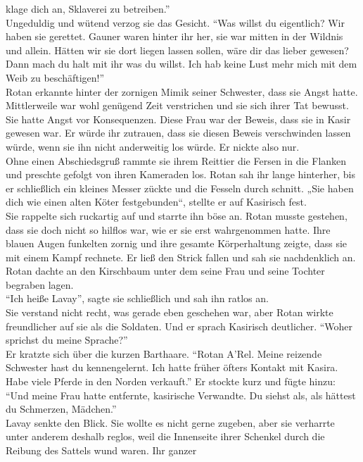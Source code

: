 klage dich an, Sklaverei zu betreiben.''\\
Ungeduldig und wütend verzog sie das Gesicht. ``Was willst du eigentlich? Wir haben sie gerettet. 
Gauner waren hinter ihr her, sie war mitten in der Wildnis und allein. Hätten wir sie dort liegen 
lassen sollen, wäre dir das lieber gewesen? Dann mach du halt mit ihr was du willst. Ich hab keine 
Lust mehr mich mit dem Weib zu beschäftigen!''\\
Rotan erkannte hinter der zornigen Mimik seiner Schwester, dass sie Angst hatte. Mittlerweile war 
wohl genügend Zeit verstrichen und sie sich ihrer Tat bewusst. Sie hatte Angst vor Konsequenzen. 
Diese Frau war der Beweis, dass sie in Kasir gewesen war. Er würde ihr zutrauen, dass sie diesen 
Beweis verschwinden lassen würde, wenn sie ihn nicht anderweitig los würde. Er nickte also nur.\\
Ohne einen Abschiedsgruß rammte sie ihrem Reittier die Fersen in die Flanken und preschte gefolgt 
von ihren Kameraden los. Rotan sah ihr lange hinterher, bis er schließlich ein kleines Messer 
zückte und die Fesseln durch schnitt. „Sie haben dich wie einen alten Köter festgebunden“, stellte 
er auf Kasirisch fest.\\
Sie rappelte sich ruckartig auf und starrte ihn böse an. Rotan musste gestehen, dass sie doch nicht 
so hilflos war, wie er sie erst wahrgenommen hatte. Ihre blauen Augen funkelten zornig und ihre 
gesamte Körperhaltung zeigte, dass sie mit einem Kampf rechnete. Er ließ den Strick fallen und sah 
sie nachdenklich an. Rotan dachte an den Kirschbaum unter dem seine Frau und seine Tochter begraben 
lagen.\\
``Ich heiße Lavay'', sagte sie schließlich und sah ihn ratlos an. \\
Sie verstand nicht recht, was gerade eben geschehen war, aber Rotan wirkte freundlicher auf sie als 
die Soldaten. Und er sprach Kasirisch deutlicher. ``Woher sprichst du meine Sprache?''\\
Er kratzte sich über die kurzen Barthaare. ``Rotan A'Rel. Meine reizende Schwester hast du 
kennengelernt. Ich hatte früher öfters Kontakt mit Kasira. Habe viele Pferde in den Norden 
verkauft.'' Er stockte kurz und fügte hinzu: ``Und meine Frau hatte entfernte, kasirische 
Verwandte. Du siehst als, als hättest du Schmerzen, Mädchen.''\\
Lavay senkte den Blick. Sie wollte es nicht gerne zugeben, aber sie verharrte unter anderem deshalb 
reglos, weil die Innenseite ihrer Schenkel durch die Reibung des Sattels wund waren. Ihr ganzer 
